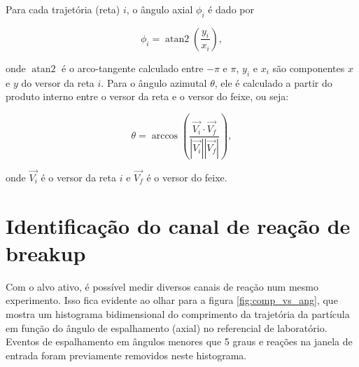 \documentclass[a4paper,12pt,oneside]{book}
\DeclareMathOperator{\atantwo}{atan2}
\begin{document}
\par Para cada trajetória (reta) $i$, o ângulo axial $\phi_i$ é dado por

\begin{equation}
	\phi_i = \atantwo \left (\frac{y_i}{x_i} \right),
\end{equation}

\par onde $\atantwo$ é o arco-tangente calculado entre $-\pi$ e $\pi$, $y_i$ e $x_i$ são componentes $x$ e $y$ do versor da reta $i$. Para o ângulo azimutal $\theta$, ele é calculado a partir do produto interno entre o versor da reta e o versor do feixe, ou seja:

\begin{equation}
	\theta = \arccos \left (\frac{\vec{V_i} \cdot \vec{V_f}}{|\vec{V_i}| |\vec{V_f}|}  \right),
\end{equation}

\par onde $\vec{V_i}$ é o versor da reta $i$ e $\vec{V_f}$ é o versor do feixe.

\section{Identificação do canal de reação de breakup}

\par Com o alvo ativo, é possível medir diversos canais de reação num mesmo experimento. Isso fica evidente ao olhar para a figura \ref{fig:comp_vs_ang}, que mostra um histograma bidimensional do comprimento da trajetória da partícula em função do ângulo de espalhamento (axial) no referencial de laboratório. Eventos de espalhamento em ângulos menores que 5 graus e reações na janela de entrada foram previamente removidos neste histograma.


%
\end{document}
